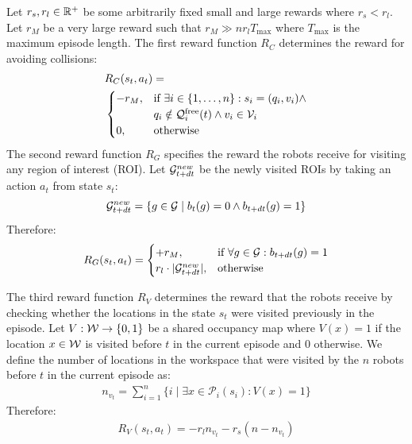 \documentclass[letterpaper, 10 pt, conference]{ieeeconf}  %
\begin{document}
Let $r_s, r_l \in \mathbb{R}^+$ be some arbitrarily fixed small and large rewards where $r_s < r_l$. Let $r_M$ be a very large reward such that $r_M \gg nr_lT_{\max} $ where $T_{\max}$ is the maximum episode length. The first reward function $R_C$ determines the reward for avoiding collisions:
\begin{align}
\label{eq:reward_c}
& R_C(s_t, a_t) = \hfill \nonumber \\
& \begin{cases}
    -r_M, &\text{if } \exists i \in \{1,\ldots,n\}: s_i = (q_i, v_i) \land \\
          & q_i \notin \config_i^{\free}(t) \land v_i \in \mathcal{V}_i \\
    0,    &\text{otherwise}
\end{cases}
\end{align}
The second reward function $R_G$ specifies the reward the robots receive for visiting any region of interest (ROI). Let $\mathcal{G}^{new}_{t+dt}$ be the newly visited ROIs by taking an action $a_t$ from state $s_t$:
\begin{equation}
    \mathcal{G}^{new}_{t+dt} = \{ g \in \mathcal{G} \mid b_t(g) = 0 \land b_{t+dt}(g) = 1 \}
\end{equation}
Therefore:
\begin{align}
R_G(s_t, a_t) = 
\begin{cases}
    +r_M, &\text{if } \forall g \in \mathcal{G}: b_{t+dt} (g) = 1 \\
    r_l \cdot |\mathcal{G}^{new}_{t+dt}|, & \text{otherwise} 
\end{cases}
\end{align}

The third reward function $R_V$ determines the reward that the robots receive by checking whether the locations in the state $s_t$ were visited previously in the episode. Let $V: {\mathcal{W}} \to \{0,1\}$ be a shared occupancy map where $V(x) = 1$ if the location $x \in \mathcal{W}$ is visited before $t$ in the current episode and 0 otherwise. We define the number of locations in the workspace that were visited by the $n$ robots before $t$ in the current episode as:
\begin{align}
n_{v_t} = \sum_{i=1}^n \{ i \mid \exists x \in \mathcal{P}_i(s_i): V(x) = 1 \}
\end{align}
Therefore:
\begin{align}
R_V(s_t, a_t) = - r_l n_{v_t} - r_s (n - n_{v_t}) \label{eq:reward_V}
\end{align}
\end{document}
